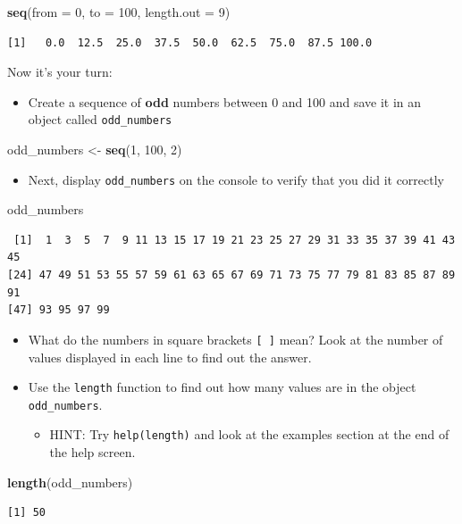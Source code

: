 \documentclass[]{article}
\newenvironment{Shaded}{\begin{snugshade}}{\end{snugshade}}
\newcommand{\DataTypeTok}[1]{\textcolor[rgb]{0.13,0.29,0.53}{#1}}
\newcommand{\DecValTok}[1]{\textcolor[rgb]{0.00,0.00,0.81}{#1}}
\newcommand{\KeywordTok}[1]{\textcolor[rgb]{0.13,0.29,0.53}{\textbf{#1}}}
\newcommand{\NormalTok}[1]{#1}
\newcommand{\StringTok}[1]{\textcolor[rgb]{0.31,0.60,0.02}{#1}}
\providecommand{\tightlist}{%
  \setlength{\itemsep}{0pt}\setlength{\parskip}{0pt}}
\begin{document}
\begin{Shaded}
\begin{Highlighting}[]
\KeywordTok{seq}\NormalTok{(}\DataTypeTok{from =} \DecValTok{0}\NormalTok{, }\DataTypeTok{to =} \DecValTok{100}\NormalTok{, }\DataTypeTok{length.out =}  \DecValTok{9}\NormalTok{)}
\end{Highlighting}
\end{Shaded}

\begin{verbatim}
[1]   0.0  12.5  25.0  37.5  50.0  62.5  75.0  87.5 100.0
\end{verbatim}

Now it's your turn:

\begin{itemize}
\tightlist
\item
  Create a sequence of \textbf{odd} numbers between 0 and 100 and save it in an object called \texttt{odd\_numbers}
\end{itemize}

\begin{Shaded}
\begin{Highlighting}[]
\NormalTok{odd_numbers <-}\StringTok{ }\KeywordTok{seq}\NormalTok{(}\DecValTok{1}\NormalTok{, }\DecValTok{100}\NormalTok{, }\DecValTok{2}\NormalTok{)}
\end{Highlighting}
\end{Shaded}

\begin{itemize}
\tightlist
\item
  Next, display \texttt{odd\_numbers} on the console to verify that you did it correctly
\end{itemize}

\begin{Shaded}
\begin{Highlighting}[]
\NormalTok{odd_numbers}
\end{Highlighting}
\end{Shaded}

\begin{verbatim}
 [1]  1  3  5  7  9 11 13 15 17 19 21 23 25 27 29 31 33 35 37 39 41 43 45
[24] 47 49 51 53 55 57 59 61 63 65 67 69 71 73 75 77 79 81 83 85 87 89 91
[47] 93 95 97 99
\end{verbatim}

\begin{itemize}
\item
  What do the numbers in square brackets \texttt{{[}\ {]}} mean? Look at the number of values displayed in each line to find out the answer.
\item
  Use the \texttt{length} function to find out how many values are in the object \texttt{odd\_numbers}.

  \begin{itemize}
  \tightlist
  \item
    HINT: Try \texttt{help(length)} and look at the examples section at the end of the help screen.
  \end{itemize}
\end{itemize}

\begin{Shaded}
\begin{Highlighting}[]
\KeywordTok{length}\NormalTok{(odd_numbers)}
\end{Highlighting}
\end{Shaded}

\begin{verbatim}
[1] 50
\end{verbatim}
\end{document}
